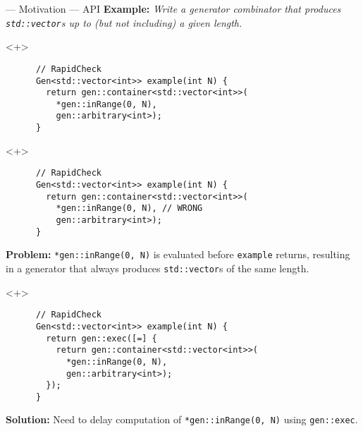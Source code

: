 \begin{frame}[fragile,t]{\halcheck{} --- Motivation --- API}
  \textbf{Example:} \emph{Write a generator combinator that produces \texttt{std::vector}s up to (but not including) a given length.}

  \begin{onlyenv}<+>
    \begin{verbatim}
      // RapidCheck
      Gen<std::vector<int>> example(int N) {
        return gen::container<std::vector<int>>(
          *gen::inRange(0, N),
          gen::arbitrary<int>);
      }
    \end{verbatim}
  \end{onlyenv}

  \begin{onlyenv}<+>
    \begin{verbatim}
      // RapidCheck
      Gen<std::vector<int>> example(int N) {
        return gen::container<std::vector<int>>(
          *gen::inRange(0, N), // WRONG
          gen::arbitrary<int>);
      }
    \end{verbatim}

    \textbf{Problem:} \texttt{*gen::inRange(0, N)} is evaluated \alert{before} \texttt{example} returns, resulting in a generator that always produces \texttt{std::vector}s of the same length.
  \end{onlyenv}

  \begin{onlyenv}<+>
    \begin{verbatim}
      // RapidCheck
      Gen<std::vector<int>> example(int N) {
        return gen::exec([=] {
          return gen::container<std::vector<int>>(
            *gen::inRange(0, N),
            gen::arbitrary<int>);
        });
      }
    \end{verbatim}

    \textbf{Solution:} Need to delay computation of \texttt{*gen::inRange(0, N)} using \texttt{gen::exec}.
  \end{onlyenv}
\end{frame}

